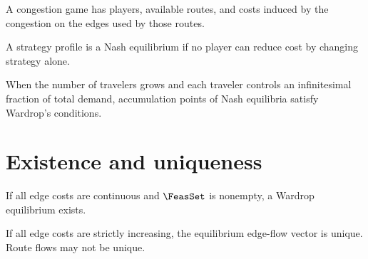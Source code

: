\begin{definition}
A congestion game has players, available routes, and costs induced by the congestion on the edges used by those routes.
\end{definition}

\begin{definition}
A strategy profile is a Nash equilibrium if no player can reduce cost by changing strategy alone.
\end{definition}

\begin{theorem}\label{thm:wardrop_nash}
When the number of travelers grows and each traveler controls an infinitesimal fraction of total demand, accumulation points of Nash equilibria satisfy Wardrop's conditions.
\end{theorem}

\section{Existence and uniqueness}

\begin{theorem}[Existence]\label{thm:existence}
If all edge costs are continuous and $\FeasSet$ is nonempty, a Wardrop equilibrium exists.
\end{theorem}

\begin{theorem}\label{thm:uniqueness}
If all edge costs are strictly increasing, the equilibrium edge-flow vector is unique. Route flows may not be unique.
\end{theorem}

